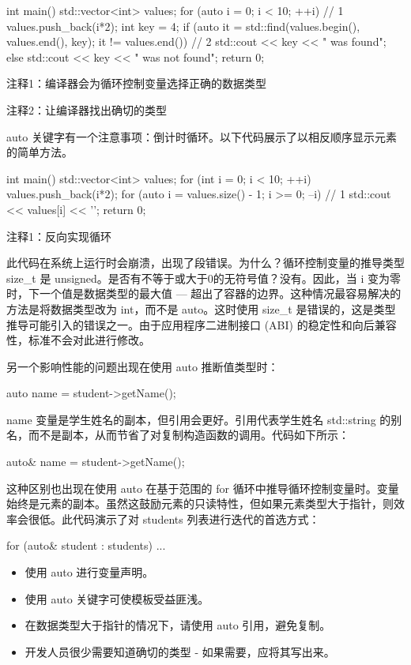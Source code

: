 
\begin{cpp}
int main() {
  std::vector<int> values;
  for (auto i = 0; i < 10; ++i) // 1
    values.push_back(i*2);
  int key = 4;
  if (auto it = std::find(values.begin(),
          values.end(), key); it != values.end()) // 2
    std::cout << key << " was found\n";
  else
    std::cout << key << " was not found\n";
  return 0;
}
\end{cpp}

{\footnotesize
注释1：编译器会为循环控制变量选择正确的数据类型

注释2：让编译器找出确切的类型
}

auto 关键字有一个注意事项：倒计时循环。以下代码展示了以相反顺序显示元素的简单方法。


\begin{cpp}
int main() {
  std::vector<int> values;
  for (int i = 0; i < 10; ++i)
    values.push_back(i*2);
  for (auto i = values.size() - 1; i >= 0; --i) // 1
    std::cout << values[i] << '\n';
  return 0;
}
\end{cpp}

{\footnotesize
注释1：反向实现循环
}

此代码在系统上运行时会崩溃，出现了段错误。为什么？循环控制变量的推导类型 size\_t 是 unsigned。是否有不等于或大于0的无符号值？没有。因此，当 i 变为零时，下一个值是数据类型的最大值 — 超出了容器的边界。这种情况最容易解决的方法是将数据类型改为 int，而不是 auto。这时使用 size\_t 是错误的，这是类型推导可能引入的错误之一。由于应用程序二进制接口 (ABI) 的稳定性和向后兼容性，标准不会对此进行修改。

另一个影响性能的问题出现在使用 auto 推断值类型时：

\begin{cpp}
auto name = student->getName();
\end{cpp}

name 变量是学生姓名的副本，但引用会更好。引用代表学生姓名 std::string 的别名，而不是副本，从而节省了对复制构造函数的调用。代码如下所示：

\begin{cpp}
auto& name = student->getName();
\end{cpp}

这种区别也出现在使用 auto 在基于范围的 for 循环中推导循环控制变量时。变量始终是元素的副本。虽然这鼓励元素的只读特性，但如果元素类型大于指针，则效率会很低。此代码演示了对 students 列表进行迭代的首选方式：

\begin{cpp}
for (auto& student : students) ...
\end{cpp}


\begin{itemize}
\item
使用 auto 进行变量声明。

\item
使用 auto 关键字可使模板受益匪浅。

\item
在数据类型大于指针的情况下，请使用 auto 引用，避免复制。

\item
开发人员很少需要知道确切的类型 - 如果需要，应将其写出来。
\end{itemize}
